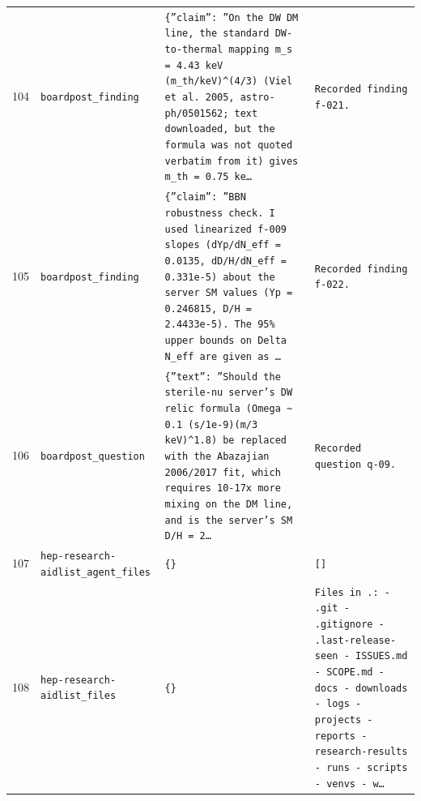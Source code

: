 \documentclass[11pt,a4paper]{article}
\begin{document}
\begin{longtable}{@{}p{}p{}p{}p{}@{}}
104 & \texttt{board}\newline\texttt{post\_\allowbreak{}finding} & \texttt{\{''claim'':\allowbreak{} ''On the DW DM line,\allowbreak{} the standard DW-to-thermal mapping m\_\allowbreak{}s =\allowbreak{} 4.43 keV (m\_\allowbreak{}th/\allowbreak{}keV)\allowbreak{}\textasciicircum{}\allowbreak{}(4/\allowbreak{}3)\allowbreak{} (Viel et al. 2005,\allowbreak{} astro-ph/\allowbreak{}0501562;\allowbreak{} text downloaded,\allowbreak{} but the formula was not quoted verbatim from it)\allowbreak{} gives m\_\allowbreak{}th =\allowbreak{} 0.75 ke\ldots{}\allowbreak{}} & \texttt{Recorded finding f-021.} \\
105 & \texttt{board}\newline\texttt{post\_\allowbreak{}finding} & \texttt{\{''claim'':\allowbreak{} ''BBN robustness check. I used linearized f-009 slopes (dYp/\allowbreak{}dN\_\allowbreak{}eff =\allowbreak{} 0.0135,\allowbreak{} dD/\allowbreak{}H/\allowbreak{}dN\_\allowbreak{}eff =\allowbreak{} 0.331e-5)\allowbreak{} about the server SM values (Yp =\allowbreak{} 0.246815,\allowbreak{} D/\allowbreak{}H =\allowbreak{} 2.4433e-5)\allowbreak{}. The 95\% upper bounds on Delta N\_\allowbreak{}eff are given as \ldots{}\allowbreak{}} & \texttt{Recorded finding f-022.} \\
106 & \texttt{board}\newline\texttt{post\_\allowbreak{}question} & \texttt{\{''text'':\allowbreak{} ''Should the sterile-nu server's DW relic formula (Omega \textasciitilde{}\allowbreak{} 0.1 (s/\allowbreak{}1e-9)\allowbreak{}(m/\allowbreak{}3 keV)\allowbreak{}\textasciicircum{}\allowbreak{}1.8)\allowbreak{} be replaced with the Abazajian 2006/\allowbreak{}2017 fit,\allowbreak{} which requires 10-17x more mixing on the DM line,\allowbreak{} and is the server's SM D/\allowbreak{}H =\allowbreak{} 2\ldots{}\allowbreak{}} & \texttt{Recorded question q-09.} \\
107 & \texttt{hep-research-aid}\newline\texttt{list\_\allowbreak{}agent\_\allowbreak{}files} & \texttt{\{\}\allowbreak{}} & \texttt{[]\allowbreak{}} \\
108 & \texttt{hep-research-aid}\newline\texttt{list\_\allowbreak{}files} & \texttt{\{\}\allowbreak{}} & \texttt{Files in .:\allowbreak{}   - .git   - .gitignore   - .last-release-seen   - ISSUES.md   - SCOPE.md   - docs   - downloads   - logs   - projects   - reports   - research-results   - runs   - scripts   - venvs   - w\ldots{}\allowbreak{}} \\

\end{longtable}
\end{document}
